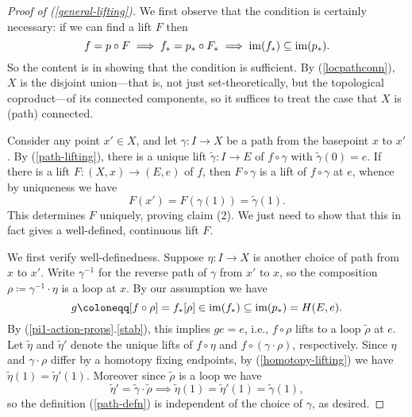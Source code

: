 \begin{proof}[Proof of (\ref{general-lifting})]
  We first observe that the condition is certainly necessary: if we
  can find a lift $F$ then
  \[
  f = p \circ F \implies f_* = p_* \circ F_* \implies \operatorname{im}(f_*)
  \subseteq \operatorname{im}(p_*).
  \]
  So the content is in showing that the condition is sufficient. By
  (\ref{locpathconn}), $X$ is the disjoint union---that is, not just
  set-theoretically, but the topological coproduct---of its connected
  components, so it suffices to treat the case that $X$ is (path)
  connected.

  Consider any point $x' \in X$, and let $\gamma : I \to X$ be a path
  from the basepoint $x$ to $x'$. By (\ref{path-lifting}), there is a
  unique lift $\tilde\gamma : I \to E$ of $f \circ \gamma$ with
  $\tilde\gamma(0) = e$. If there is a lift $F : (X,x) \to (E,e)$ of
  $f$, then $F \circ \gamma$ is a lift of $f \circ \gamma$ at $e$,
  whence by uniqueness we have
  \begin{equation}
    \label{path-defn}
    F(x') = F(\gamma(1)) = \tilde\gamma(1).
  \end{equation}
  This determines $F$ uniquely, proving claim (2). We just need to
  show that this in fact gives a well-defined, continuous lift $F$.

  We first verify well-definedness. Suppose $\eta : I \to X$ is
  another choice of path from $x$ to $x'$. Write $\gamma^{-1}$ for the
  reverse path of $\gamma$ from $x'$ to $x$, so the composition $\rho
  \coloneqq \gamma^{-1} \cdot \eta$ is a loop at $x$. By our
  assumption we have
  \[
  g \coloneqq [f \circ \rho] = f_*[\rho] \in \im(f_*) \subseteq
  \im(p_*) = H(E,e).
  \]
  By (\ref{pi1-action-props}.\ref{stab}), this implies $ge = e$, i.e.,
  $f \circ \rho$ lifts to a loop $\tilde\rho$ at $e$. Let $\tilde\eta$
  and $\tilde\eta'$ denote the unique lifts of $f \circ \eta$ and $f
  \circ (\gamma \cdot \rho)$, respectively. Since $\eta$ and $\gamma
  \cdot \rho$ differ by a homotopy fixing endpoints, by
  (\ref{homotopy-lifting}) we have $\tilde\eta(1) =
  \tilde\eta'(1)$. Moreover since $\tilde\rho$ is a loop we have
  \[
  \tilde\eta' = \tilde\gamma \cdot \tilde\rho \implies \tilde\eta(1)=
  \tilde\eta'(1) = \tilde\gamma(1),
  \]
  so the definition (\ref{path-defn}) is independent of the choice of
  $\gamma$, as desired.


\end{proof}
